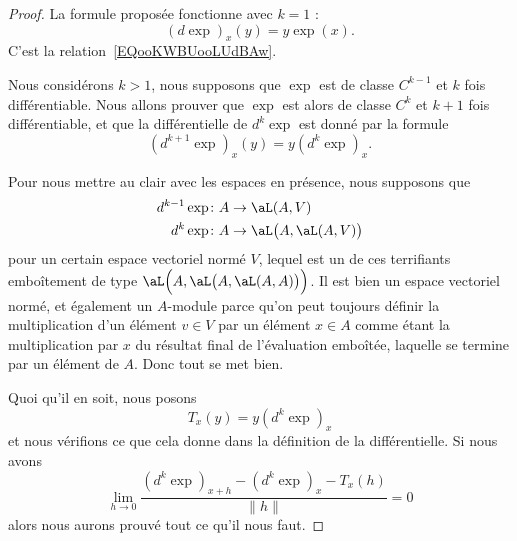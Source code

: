 \begin{proof}
	La formule proposée fonctionne avec \( k=1\) :
	\begin{equation}
		(d\exp)_x(y)=y\exp(x).
	\end{equation}
	C'est la relation~\ref{EQooKWBUooLUdBAw}.

	Nous considérons \( k>1\), nous supposons que \( \exp\) est de classe \( C^{k-1}\) et \( k\) fois différentiable. Nous allons prouver que \( \exp\) est alors de classe \( C^k\) et \( k+1\) fois différentiable, et que la différentielle de \( d^k\exp\) est donné par la formule
	\begin{equation}
		(d^{k+1}\exp)_x(y)=y(d^{k}\exp)_x.
	\end{equation}

	Pour nous mettre au clair avec les espaces en présence, nous supposons que
	\begin{subequations}
		\begin{align}
			d^{k-1}\exp & \colon A\to \aL(A,V)                  \\
			d^{k}\exp   & \colon A\to \aL\big( A,\aL(A,V) \big)
		\end{align}
	\end{subequations}
	pour un certain espace vectoriel normé \( V\), lequel est un de ces terrifiants emboîtement de type \( \aL\Big( A,\aL\big( A,\aL(A,A) \big) \Big)\). Il est bien un espace vectoriel normé, et également un \( A\)-module parce qu'on peut toujours définir la multiplication d'un élément \( v\in V\) par un élément \(x\in A\) comme étant la multiplication par \( x\) du résultat final de l'évaluation emboîtée, laquelle se termine par un élément de \( A\). Donc tout se met bien.

	Quoi qu'il en soit, nous posons
	\begin{equation}
		T_x(y)=y(d^{k}\exp)_x
	\end{equation}
	et nous vérifions ce que cela donne dans la définition de la différentielle. Si nous avons
	\begin{equation}
		\lim_{h\to 0} \frac{ (d^k\exp)_{x+h}-(d^k\exp)_x-T_x(h) }{ \| h \| }=0
	\end{equation}
	alors nous aurons prouvé tout ce qu'il nous faut.


\end{proof}
